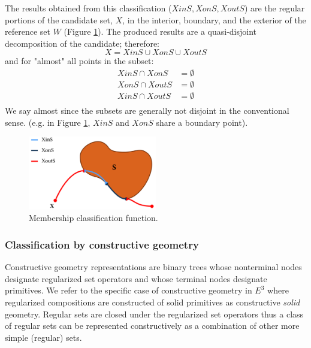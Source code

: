 \documentclass[a4paper,11pt,oneside]{article}
\begin{document}
The results obtained from this classification ($XinS, XonS, XoutS$) are the regular portions of the candidate set, $X$, in the interior, boundary, and the exterior of the reference set $W$ (Figure \ref{sec3.2:membership_classification}). The produced results are a quasi-disjoint decomposition of the candidate; therefore:
\begin{equation}
	X = XinS \cup XonS \cup XoutS
\end{equation}
and for "almost" all points in the subset:
\begin{align*}
	XinS \cap XonS  & = \emptyset \\
	XonS \cap XoutS & = \emptyset \\
	XinS \cap XoutS & = \emptyset \\
\end{align*}
We say almost since the subsets are generally not disjoint in the conventional sense. (e.g. in Figure \ref{sec3.2:membership_classification}, $XinS$ and $XonS$ share a boundary point). \cite{mansfield_1987}



\begin{figure}[ht]
	\begin{center}
		\includegraphics[width=0.5\textwidth]{section3/3.2/membership-classification.png}
	\end{center}
	\caption{Membership classification function.}
	\label{sec3.2:membership_classification}
\end{figure}

\subsubsection{Classification by constructive geometry}

Constructive geometry representations are binary trees whose nonterminal nodes designate regularized set operators and whose terminal nodes designate primitives.  We refer to the specific case of constructive geometry in $E^3$ where regularized compositions are constructed of solid primitives as constructive \textit{solid} geometry. Regular sets are closed under the regularized set operators thus a class of regular sets can be represented constructively as a combination of other more simple (regular) sets. \cite{Requicha1978MathematicalFO} 
\end{document}
